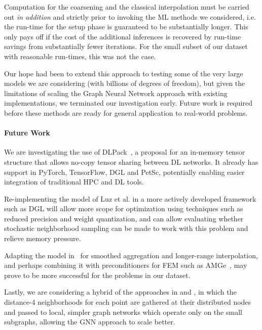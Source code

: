 \documentclass{svproc}
\newcommand{\etal}{et al. }
\begin{document}
Computation for the coarsening and the classical interpolation must be carried out \textit{in addition} and strictly prior to invoking the ML methods we considered, i.e. the run-time for the setup phase is guaranteed to be substantially longer.  This only pays off if the cost of the additional inferences is recovered by run-time savings from substantially fewer iterations. For the small subset of our dataset with reasonable run-times, this was not the case. 

Our hope had been to extend this approach to testing some of the very large models we are considering (with billions of degrees of freedom), but given the limitations of scaling the Graph Neural Network approach with existing implementations, we terminated our investigation early. Future work is required before these methods are ready for general application to real-world problems.

\paragraph{Future Work}
We are investigating the use of DLPack~\cite{dlpack}, a proposal for an in-memory tensor structure that allows no-copy tensor sharing between DL networks. It already has support in PyTorch, TensorFlow, DGL and PetSc, potentially enabling easier integration of traditional HPC and DL tools.

Re-implementing the model of Luz \etal in a more actively developed framework such as DGL will allow more scope for optimization using techniques such as reduced precision and weight quantization, and can allow evaluating whether stochastic neighborhood sampling can be made to work with this problem and relieve memory pressure.

Adapting the model in~\cite{Luz2020} for smoothed aggregation and longer-range interpolation, and perhaps combining it with preconditioners for FEM such as AMGe~\cite{brezina2001algebraic}, may prove to be more successful for the problems in our dataset. 

Lastly, we are considering a hybrid of the approaches in \cite{Greenfeld2019} and \cite{Luz2020}, in which the distance-4 neighborhoods for each point are gathered at their distributed nodes and passed to local, simpler graph networks which operate only on the small subgraphs, allowing the GNN approach to scale better.
\end{document}
